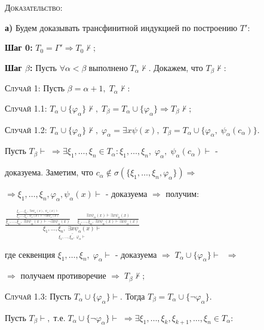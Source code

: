 \documentclass[18pt, a4paper]{extarticle}
\newcommand{\Gm}{\Gamma}
\newcommand{\vp}{\varphi}
\newcommand{\vd}{\vdash}
\newcommand{\dok}{\textsc{Доказательство:}}
\begin{document}
\dok

\textbf{а)} Будем доказывать трансфинитной индукцией по построению $T'$:

\textbf{Шаг 0:} $T_0=\Gm'\Rightarrow T_0\nvdash;$

\textbf{Шаг $\beta$:} Пусть $\forall\alpha<\beta\;\text{выполнено}\;T_\alpha\nvdash$. Докажем, что $T_\beta\nvdash$:

\qquad \textsc{Случай 1:} Пусть $\beta=\alpha+1,\;T_\alpha\nvdash:$

\qquad\qquad \textsc{Случай 1.1:} $T_\alpha\cup\{\vp_\alpha\}\nvdash,\;T_\beta=T_\alpha\cup\{\vp_\alpha\}\Rightarrow T_\beta\nvdash;$

\qquad\qquad \textsc{Случай 1.2:} $T_\alpha\cup\{\vp_\alpha\}\nvdash,\;\vp_\alpha=\exists x\psi(x),\;T_\beta=T_\alpha\cup\{\vp_\alpha,\;\psi_\alpha(c_\alpha)\}$.

\qquad\qquad Пусть $T_\beta\vdash\;\Rightarrow\exists\xi_1,\dots,\xi_n\in T_\alpha:\xi_1,\dots,\xi_n,\;\vp_\alpha,\;\psi_\alpha(c_\alpha)\vdash$ -  

\qquad\qquad доказуема. Заметим, что $c_\alpha\notin\sigma(\{\xi_1,\dots,\xi_n,\vp_\alpha\})\Rightarrow$

\qquad\qquad $\Rightarrow\xi_1,\dots,\xi_n,\vp_\alpha,\psi_\alpha(x)\vdash$ -  доказуема $\Rightarrow$ получим:

\begin{center}
    $\displaystyle \frac{\displaystyle \frac{\displaystyle \frac{\xi_1,\dots,\xi_n,\;\exists x\psi_\alpha(x),\;\psi_\alpha(x)\vd}{\xi_1,\dots,\xi_n,\;\psi_\alpha(x)\vd\lnot\exists x\psi_\alpha(x)}}{\xi_1,\dots,\xi_n,\;\exists x\psi_\alpha(x)\vd\lnot\exists x\psi_\alpha(x)}\;\;\;\; \displaystyle \frac{\exists x\psi_\alpha(x)\vd\exists x\psi_\alpha(x)}{\xi_1,\dots,\xi_n,\;\exists x\psi_\alpha(x)\vd\exists x\psi_\alpha(x)}}{\underset{\displaystyle\xi_1,\dots,\xi_n,\;\vp_\alpha\vd}{\underline{\xi_1,\dots,\xi_n,\;\exists x\psi_\alpha(x)\vd}}}$
\end{center}

\qquad\qquad где секвенция $\xi_1,\dots,\xi_n,\;\vp_\alpha\vd$ -  доказуема $\Rightarrow\;T_\alpha\cup\{\vp_\alpha\}\vd\;\;\Rightarrow$

\qquad\qquad $\Rightarrow$ получаем противоречие $\Rightarrow\;T_\beta\nvdash;$

\qquad\qquad \textsc{Случай 1.3:} Пусть $T_\alpha\cup\{\vp_\alpha\}\vdash$. Тогда $T_\beta=T_\alpha\cup\{\lnot\vp_\alpha\}$.

\qquad\qquad Пусть $T_\beta\vd,\;\text{т.е.}\;T_\alpha\cup\{\lnot\vp_\alpha\}\vd\;\Rightarrow\exists\xi_1,\dots,\xi_k,\xi_{k+1},\dots,\xi_n\in T_\alpha:$
\end{document}
